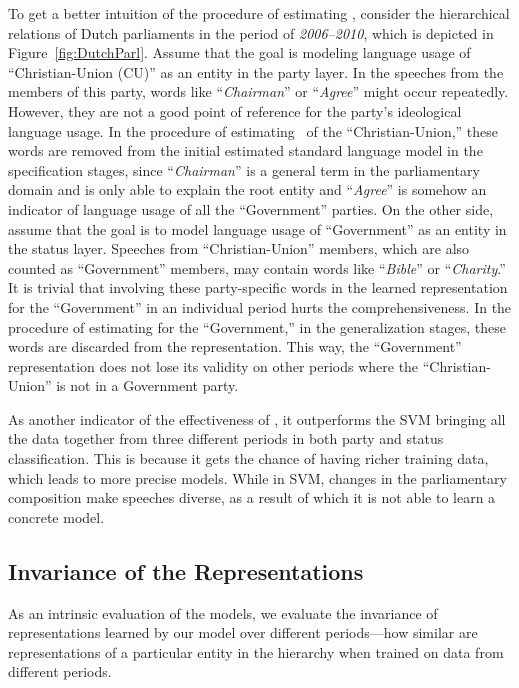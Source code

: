 To get a better intuition of the procedure of estimating \acswlm, consider the hierarchical relations of Dutch parliaments in the period of \emph{2006--2010}, which is depicted in Figure~\ref{fig:DutchParl}. 
%
Assume that the goal is modeling language usage of ``Christian-Union (CU)'' as an entity in the party layer. In the speeches from the members of this party, words like ``\emph{Chairman}'' or ``\emph{Agree}'' might occur repeatedly. However, they are not a good point of reference for the party's ideological language usage. In the procedure of estimating \acswlm\ of the ``Christian-Union,'' these words are removed from the initial estimated standard language model in the specification stages, since ``\emph{Chairman}'' is a general term in the parliamentary domain and is only able to explain the root entity and ``\emph{Agree}'' is somehow an indicator of language usage of all the ``Government'' parties.
%
On the other side, assume that the goal is to model language usage of ``Government'' as an entity in the status layer. Speeches from ``Christian-Union'' members, which are also counted as ``Government'' members, may contain words like ``\emph{Bible}'' or ``\emph{Charity}.''  It is trivial that involving these party-specific words in the learned representation for the ``Government'' in an individual period hurts the comprehensiveness. In the procedure of estimating \acswlm for the ``Government,'' in the generalization stages, these words are discarded from the representation. This way, the ``Government'' representation does not lose its validity on other periods where the ``Christian-Union'' is not in a Government party.

As another indicator of the effectiveness of \acswlm, it outperforms the SVM bringing all the data together from three different periods in both party and status classification. This is because it gets the chance of having richer training data, which leads to more precise models. While in SVM, changes in the parliamentary composition make speeches diverse, as a result of which it is not able to learn a concrete model. 
\subsection{Invariance of the Representations}

As an intrinsic evaluation of the models, we evaluate the invariance of representations learned by our model over different periods---how similar are representations of a particular entity in the hierarchy when trained on data from different periods. 
%


